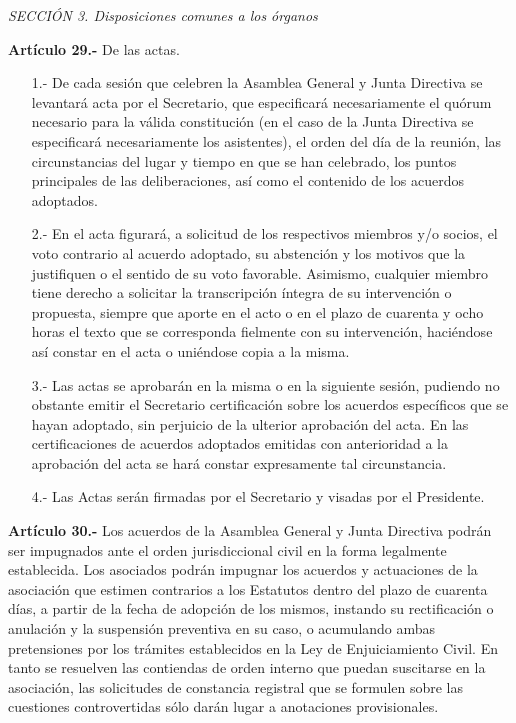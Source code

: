\documentclass[a4paper,12pt]{article}
\begin{document}
\begin{onehalfspace}
\bigskip\bigskip

\textit{SECCIÓN 3\textordfeminine. Disposiciones comunes a los órganos}

\bigskip\bigskip

\textbf{Artículo 29.-} De las actas.
\begin{itemize}
\item [1.-] De cada sesión que celebren la Asamblea General y Junta Directiva   se   levantará    acta   por el Secretario,  que  especificará necesariamente el quórum necesario para la válida constitución (en el caso de la Junta Directiva se especificará necesariamente los asistentes), el orden del día de la reunión, las circunstancias del lugar y tiempo en que se han celebrado, los puntos principales de las deliberaciones, así como el contenido de los acuerdos adoptados.
\item [2.-] En el acta figurará, a solicitud de los respectivos miembros y/o socios, el voto contrario al acuerdo adoptado, su abstención y los motivos que la justifiquen o el sentido de su voto favorable. Asimismo, cualquier miembro tiene derecho a solicitar la transcripción íntegra de su intervención o propuesta, siempre que aporte en el acto o en el plazo de cuarenta y ocho horas el texto que se corresponda fielmente con su intervención, haciéndose así constar en el acta o uniéndose copia a la misma.
\item [3.-] Las actas se aprobarán en la misma o en la siguiente sesión, pudiendo no obstante emitir el Secretario certificación sobre los acuerdos específicos que se hayan adoptado, sin perjuicio de la ulterior aprobación del acta. En las certificaciones de acuerdos adoptados emitidas con anterioridad a la aprobación del acta se hará constar expresamente tal circunstancia.
\item [4.-] Las Actas serán firmadas por el Secretario y visadas por el Presidente.
\end{itemize}

\bigskip\bigskip

\textbf{Artículo 30.-} Los acuerdos de la Asamblea General y Junta Directiva podrán ser impugnados ante el orden jurisdiccional civil en la forma legalmente establecida. Los asociados podrán impugnar los acuerdos y actuaciones de la asociación que estimen contrarios a los Estatutos dentro del plazo de cuarenta días, a partir de la fecha de adopción de los mismos, instando su rectificación o anulación y la suspensión preventiva en su caso, o acumulando ambas pretensiones por los trámites establecidos en la Ley de Enjuiciamiento Civil. En tanto se resuelven las contiendas de orden interno que puedan suscitarse en la asociación, las solicitudes de constancia registral que se formulen sobre las cuestiones controvertidas sólo darán lugar a anotaciones provisionales.


\end{onehalfspace}
\end{document}
